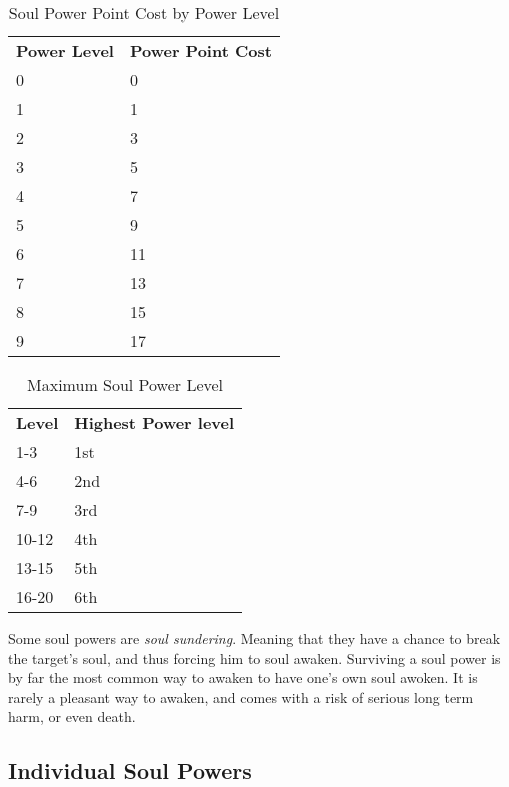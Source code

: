 \begin{table}[!htb]
  \caption{Soul Power Point Cost by Power Level}
  \begin{tabular}{p{2cm} p{3cm}}
    \textbf{Power Level} & \textbf{Power Point Cost} \\
    0 &  0 \\
    1 &  1 \\
    2 &  3 \\
    3 &  5 \\
    4 &  7 \\
    5 &  9 \\
    6 & 11 \\
    7 & 13 \\
    8 & 15 \\
    9 & 17
  \end{tabular}
\end{table}

\begin{table}[!htb]
  \caption{Maximum Soul Power Level}
  \begin{tabular}{p{2cm} p{3cm}}
    \textbf{Level} & \textbf{Highest Power level} \\
    1-3   & 1st \\
    4-6   & 2nd \\
    7-9   & 3rd \\
    10-12 & 4th \\
    13-15 & 5th \\
    16-20 & 6th
  \end{tabular}
\end{table}

Some soul powers are \emph{soul sundering}. Meaning that they have a chance
to break the target's soul, and thus forcing him to soul awaken. Surviving a
soul power is by far the most common way to awaken to have one's own soul
awoken. It is rarely a pleasant way to awaken, and comes with a risk of
serious long term harm, or even death.

\subsection{Individual Soul Powers}


